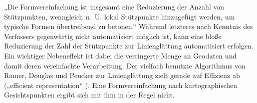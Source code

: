 \documentclass[../main/thesis.tex]{subfiles}
\begin{document}
„Die Formvereinfachung ist insgesamt eine Reduzierung der Anzahl von Stützpunkten, wenngleich u.~U. lokal Stützpunkte hinzugefügt werden, um typische Formen übertreibend zu betonen.“ 
Während letzteres nach Kenntnis des Verfassers gegenwärtig nicht automatisiert möglich ist, kann eine bloße Reduzierung der Zahl der Stützpunkte zur Linienglättung automatisiert erfolgen.
Ein wichtiger Nebeneffekt ist dabei die verringerte Menge an Geodaten und damit deren vereinfachte Verarbeitung.
Der vielfach benutzte Algorithmus von Ramer, Douglas und Peucker zur Linienglättung zielt gerade auf Effizienz ab („efficient representation“ ).
Eine Formvereinfachung nach kartographischen Gesichtspunkten ergibt sich mit ihm in der Regel nicht.

\end{document}
